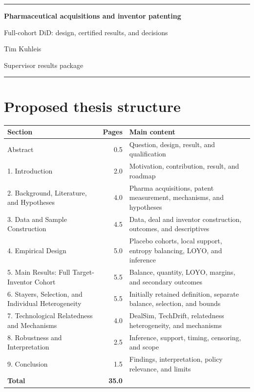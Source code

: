\documentclass[10pt,a4paper]{article}
\begin{document}
\begin{titlepage}
  \thispagestyle{empty}
  \vspace*{8mm}
  {\color{ThesisGreen}\rule{\textwidth}{2.2pt}}\par
  \vspace{10mm}
  {\fontsize{27}{31}\selectfont\bfseries\color{ThesisInk}
   Pharmaceutical acquisitions and inventor patenting\par}
  \vspace{4mm}
  {\Large\color{ThesisGreen}
   Full-cohort DiD: design, certified results, and decisions\par}
  \vspace{12mm}
  {\large Tim Kuhleis\par}
  \vspace{2mm}
  {\color{ThesisGrey}Supervisor results package \textbullet\ \BuildDate\par}
  \vfill
  {\color{ThesisGreen}\rule{\textwidth}{2.2pt}}\par
\end{titlepage}

\section{Proposed thesis structure}

\begin{table}[H]
\centering
\small
\begin{tabularx}{\textwidth}{@{}Y r Y@{}}
\toprule
Section & Pages & Main content \\
\midrule
Abstract & 0.5 & Question, design, result, and qualification \\
1. Introduction & 2.0 & Motivation, contribution, result, and roadmap \\
2. Background, Literature, and Hypotheses & 4.0 & Pharma acquisitions,
patent measurement, mechanisms, and hypotheses \\
3. Data and Sample Construction & 4.5 & Data, deal and inventor construction,
outcomes, and descriptives \\
4. Empirical Design & 5.0 & Placebo cohorts, local support, entropy
balancing, LOYO, and inference \\
5. Main Results: Full Target-Inventor Cohort & 5.5 & Balance, quantity,
LOYO, margins, and secondary outcomes \\
6. Stayers, Selection, and Individual Heterogeneity & 5.5 & Initially
retained definition, separate balance, selection, and bounds \\
7. Technological Relatedness and Mechanisms & 4.0 & DealSim, TechDrift,
relatedness heterogeneity, and mechanisms \\
8. Robustness and Interpretation & 2.5 & Inference, support, timing,
censoring, and scope \\
9. Conclusion & 1.5 & Findings, interpretation, policy relevance, and limits \\
\midrule
\textbf{Total} & \textbf{35.0} & \\
\bottomrule
\end{tabularx}
\end{table}
\end{document}
